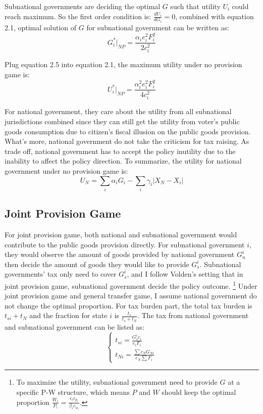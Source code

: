 \begin{itemize}
Subnational governments are deciding the optimal $G$ such that utility $U_i$ could reach maximum. So the first order condition is:
$\frac{dU_i}{dG_i}=0$, combined with equation 2.1, optimal solution of $G$ for subnational government can be written as:
\begin{equation}
    G_i^*|_{NP}=\frac{\alpha_i e_i^2 F_i^2}{2 c_i^2}
\end{equation}

Plug equation 2.5 into equation 2.1, the maximum utility under no provision game is:
\begin{equation}
    U_i^*|_{NP}=\frac{\alpha_i^2 e_i^2 F_i^2}{4c_i^2}
\end{equation}

For national government, they care about the utility from all subnational jurisdictions combined since they can still get the utility from voter's public goods consumption due to citizen's fiscal illusion on the public goods provision. What's more, national government do not take the criticism for tax raising. As trade off, national government has to accept the policy inutility due to the inability to affect the policy direction. To summarize, the utility for national government under no provision game is:
$$U_N=\sum_i\alpha_i G_i-\sum_i \gamma_i|X_N-X_i|$$

\subsection{Joint Provision Game}
For joint provision game, both national and subnational government would contribute to the public goods provision directly. For subnational government $i$, they would observe the amount of goods provided by national government $G_n^i$ then decide the amount of goods they would like to provide $G_s^i$. Subnational governments' tax only need to cover $G_s^i$, and I follow Volden's setting that in joint provision game, subnational government decide the policy outcome. \footnote{To maximize the utility, subnational government need to provide $G$ at a specific P-W structure, which means $P$ and $W$ should keep the optimal proportion $\frac{W_i}{P_i}=\frac{\epsilon_i c_{p_i}}{\beta_ic_{w_i}}$.} Under joint provision game and general transfer game, I assume national government do not change the optimal proportion. For tax burden part, the total tax burden is $t_{si}+t_N$ and the fraction for state $i$ is $\frac{t_s}{t_s+t_N}$. The tax from national government and subnational government can be listed as:
$$
    \left\{\begin{array}{l}
        t_{si}= \frac{G_s^i c_{i}}{e_i F_i} \\
        t_{Ni}=\frac{\sum c_N G_{Ni}}{e_N\sum F_i }
    \end{array}\right.
$$


\end{itemize}
